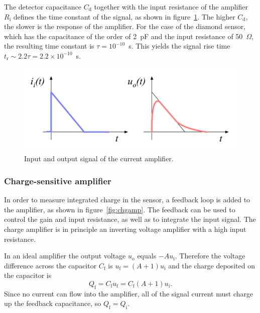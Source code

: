The detector capacitance $C_\mathrm{d}$ together with the input resistance of the amplifier $R_\mathrm{i}$ defines the time constant of the signal, as shown in figure~\ref{fig:currc}. The higher $C_\mathrm{d}$, the slower is the response of the amplifier. For the case of the diamond sensor, which has the capacitance of the order of 2~pF and the input resistance of 50~$\Omega$, the resulting time constant is $\tau=10^{-10}$~s. This yields the signal rise time $t_\mathrm{r}\sim2.2\tau=2.2\times10^{-10}$~s.

\begin{figure}[!t]
\begin{center}
\includegraphics[width=0.7\linewidth]{02_pulse_formation/pics/plots/currrc}
\caption{Input and output signal of the current amplifier.}
\label{fig:currc}
\end{center}
\end{figure}



\subsubsection{Charge-sensitive amplifier}
In order to measure integrated charge in the sensor, a feedback loop is added to the amplifier, as shown in figure~\ref{fig:chgamp}. The feedback can be used to control the gain and input resistance, as well as to integrate the input signal. The charge amplifier is in principle an inverting voltage amplifier with a high input resistance. 
 
In an ideal amplifier the output voltage $u_\mathrm{o}$ equals $-Au_\mathrm{i}$. Therefore the voltage difference across the capacitor $C_\mathrm{f}$ is $u_\mathrm{f}=(A+1)u_\mathrm{i}$ and the charge deposited on the capacitor is
\begin{equation}
Q_\mathrm{f}=C_\mathrm{f}u_\mathrm{f} = C_\mathrm{f}(A+1)u_\mathrm{i}.
\end{equation}
Since no current can flow into the amplifier, all of the signal current must charge up the feedback capacitance, so $Q_\mathrm{f} = Q_\mathrm{i}$.

